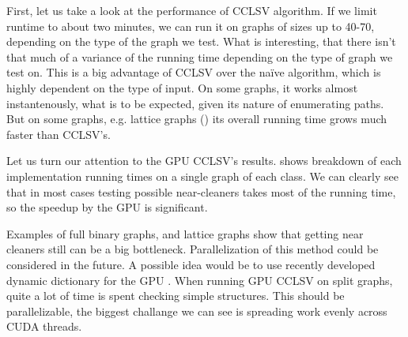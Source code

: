 First, let us take a look at the performance of CCLSV algorithm. If we limit runtime to about two minutes, we can run it on graphs of sizes up to 40-70, depending on the type of the graph we test. What is interesting, that there isn't that much of a variance of the running time depending on the type of graph we test on. This is a big advantage of CCLSV over the na\"ive algorithm, which is highly dependent on the type of input. On some graphs, it works almost instantenously, what is to be expected, given its nature of enumerating paths. But on some graphs, e.g. lattice graphs () its overall running time grows much faster than CCLSV's.

Let us turn our attention to the GPU CCLSV's results.  shows breakdown of each implementation running times on a single graph of each class. We can clearly see that in most cases testing possible near-cleaners takes most of the running time, so the speedup by the GPU is significant. 

Examples of full binary graphs, and lattice graphs show that getting near cleaners still can be a big bottleneck. Parallelization of this method could be considered in the future. A possible idea would be to use recently developed dynamic dictionary for the GPU \cite{Ashkiani2018}. When running GPU CCLSV on split graphs, quite a lot of time is spent checking simple structures. This should be parallelizable, the biggest challange we can see is spreading work evenly across CUDA threads.




